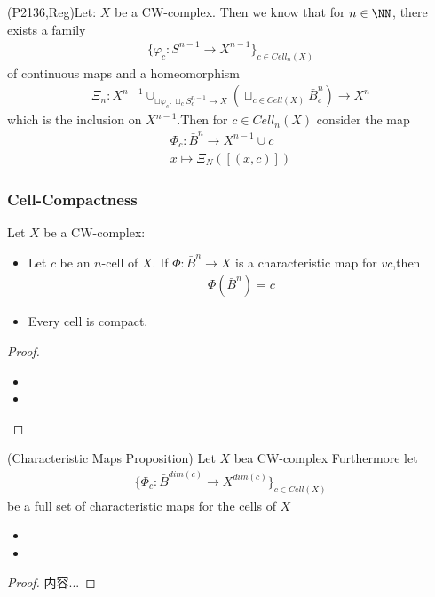 \documentclass[Total.tex]{subfiles}
\begin{document}
	\begin{Def}
		(P2136,Reg)Let: $X$ be a CW-complex. Then we know that for $n\in \NN$, there exists a family
		\begin{gather*}
			\{\varphi_c:S^{n-1}\rightarrow X^{n-1}\}_{c\in Cell_n(X)}
		\end{gather*}
		of continuous maps and a homeomorphism
		\begin{gather*}
			\Xi_n:X^{n-1}\cup_{\sqcup \varphi_c:\sqcup_c S_c^{n-1}\rightarrow X} (\sqcup_{c\in Cell(X)} \bar{B}^n_c)\rightarrow X^n
		\end{gather*}
		which is the inclusion on $X^{n-1}$.Then for $c\in Cell_n(X)$ consider the map
		\begin{gather*}
			\Phi_c:\bar{B}^n\rightarrow X^{n-1}\cup c\\
			x\mapsto \Xi_N([(x,c)])
		\end{gather*} 
	\end{Def}
	\subsubsection{Cell-Compactness}
	\begin{proposition}
		Let $X$ be a CW-complex:
		\begin{itemize}
			\item Let $c$ be an $n$-cell of $X$. If $\Phi:\bar{B}^n\rightarrow X$ is a characteristic map for $vc$,then
			\begin{gather*}
				\Phi(\bar{B}^n)=c
			\end{gather*}
			\item Every cell is compact.
		\end{itemize}
	\end{proposition}
	\begin{proof}
		\begin{itemize}
			\item 
			\item 
		\end{itemize}
	\end{proof}
	
	\begin{proposition}
		(Characteristic Maps Proposition) Let $X$ bea CW-complex Furthermore let
		\begin{gather*}
			\{\Phi_c:\bar{B}^{dim(c)}\rightarrow X^{dim(c)}\}_{c\in Cell(X)}
		\end{gather*}
		be a full set of characteristic maps for the cells of $X$
		\begin{itemize}
			\item 
			\item 
		\end{itemize}
	\end{proposition}
	\begin{proof}
		内容...
	\end{proof}
\end{document}
